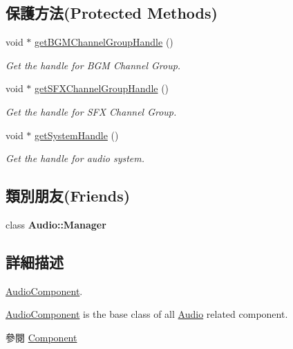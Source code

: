 \subsection*{保護方法(Protected Methods)}
\begin{DoxyCompactItemize}
\item 
void $\ast$ \hyperlink{class_i_dream_sky_1_1_audio_component_ac58de982ae5541a8ab4a81e82975b1f2}{get\+B\+G\+M\+Channel\+Group\+Handle} ()
\begin{DoxyCompactList}\small\item\em Get the handle for B\+GM Channel Group. \end{DoxyCompactList}\item 
void $\ast$ \hyperlink{class_i_dream_sky_1_1_audio_component_a0c2a36f6dde86cd50f889cbc5825da17}{get\+S\+F\+X\+Channel\+Group\+Handle} ()
\begin{DoxyCompactList}\small\item\em Get the handle for S\+FX Channel Group. \end{DoxyCompactList}\item 
void $\ast$ \hyperlink{class_i_dream_sky_1_1_audio_component_a66fcbd1e83043254ed81220d82c0c565}{get\+System\+Handle} ()
\begin{DoxyCompactList}\small\item\em Get the handle for audio system. \end{DoxyCompactList}\end{DoxyCompactItemize}
\subsection*{類別朋友(Friends)}
\begin{DoxyCompactItemize}
\item 
class {\bfseries Audio\+::\+Manager}\hypertarget{class_i_dream_sky_1_1_audio_component_a3ad7b469f47b268897de410969c1c7cd}{}\label{class_i_dream_sky_1_1_audio_component_a3ad7b469f47b268897de410969c1c7cd}

\end{DoxyCompactItemize}


\subsection{詳細描述}
\hyperlink{class_i_dream_sky_1_1_audio_component}{Audio\+Component}. 

\hyperlink{class_i_dream_sky_1_1_audio_component}{Audio\+Component} is the base class of all \hyperlink{class_i_dream_sky_1_1_audio}{Audio} related component. \begin{DoxySeeAlso}{參閱}
\hyperlink{class_i_dream_sky_1_1_component}{Component} 
\end{DoxySeeAlso}


